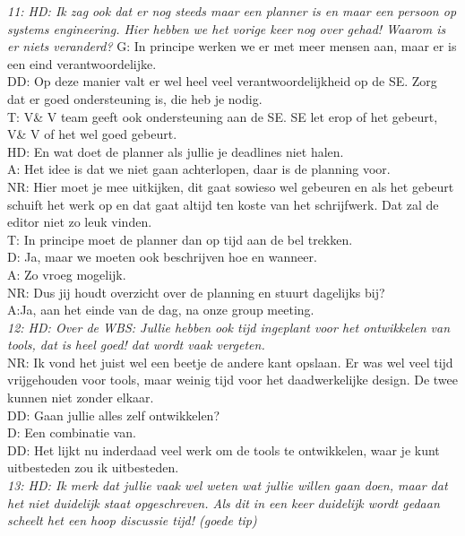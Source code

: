 \textit{11: HD: Ik zag ook dat er nog steeds maar een planner is en maar een persoon op systems engineering. Hier hebben we het vorige keer nog over gehad! Waarom is er niets veranderd?}
G: In principe werken we er met meer mensen aan, maar er is een eind verantwoordelijke.\\
DD: Op deze manier valt er wel heel veel verantwoordelijkheid op de SE. Zorg dat er goed ondersteuning is, die heb je nodig.\\
T: V\& V team geeft ook ondersteuning aan de SE. SE let erop of het gebeurt, V\& V of het wel goed gebeurt.\\
HD: En wat doet de planner als jullie je deadlines niet halen.\\
A: Het idee is dat we niet gaan achterlopen, daar is de planning voor.\\
NR: Hier moet je mee uitkijken, dit gaat sowieso wel gebeuren en als het gebeurt schuift het werk op en dat gaat altijd ten koste van het schrijfwerk. Dat zal de editor niet zo leuk vinden.\\
T: In principe moet de planner dan op tijd aan de bel trekken.\\
D: Ja, maar we moeten ook beschrijven hoe en wanneer.\\
A: Zo vroeg mogelijk.\\
NR: Dus jij houdt overzicht over de planning en stuurt dagelijks bij?\\
A:Ja, aan het einde van de dag, na onze group meeting.\\

\textit{12: HD: Over de WBS: Jullie hebben ook tijd ingeplant voor het ontwikkelen van tools, dat is heel goed! dat wordt vaak vergeten.}\\
NR: Ik vond het juist wel een beetje de andere kant opslaan. Er was wel veel tijd vrijgehouden voor tools, maar weinig tijd voor het daadwerkelijke design. De twee kunnen niet zonder elkaar.\\
DD: Gaan jullie alles zelf ontwikkelen?\\
D: Een combinatie van.\\
DD: Het lijkt nu inderdaad veel werk om de tools te ontwikkelen, waar je kunt uitbesteden zou ik uitbesteden.\\

\textit{13: HD: Ik merk dat jullie vaak wel weten wat jullie willen gaan doen, maar dat het niet duidelijk staat opgeschreven. Als dit in een keer duidelijk wordt gedaan scheelt het een hoop discussie tijd! (goede tip)}\\

